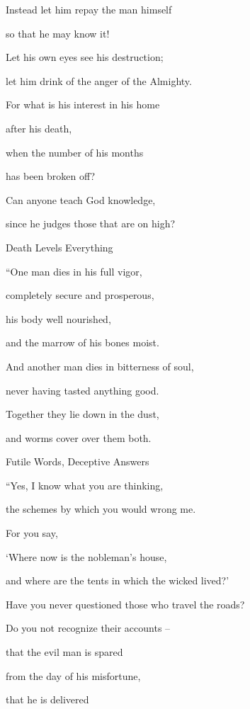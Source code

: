 {\par }{\Q Instead let him repay
the man himself

\par }{\Q so that he may know it!
\par }{\Q {}Let his own eyes
see
his destruction;
\par }{\Q let him drink
of the anger
of the Almighty.
\par }{\Q {}For
what
is his interest
in his
home
\par }{\Q after
his death,

\par }{\Q when
the number
of his
months
\par }{\Q has been broken off?
\par }{\Q {}Can anyone teach
God
knowledge,
\par }{\Q since he judges
those that are on high?
\par }{\SH Death Levels Everything
\par }{\Q {}“One
man dies
in his full
vigor,
\par }{\Q completely
secure
and prosperous,
\par }{\Q {}his body
well nourished,
\par }{\Q and the marrow
of his bones
moist.
\par }{\Q {}And another man
dies
in bitterness
of soul,
\par }{\Q never
having tasted
anything good.
\par }{\Q {}Together
they lie
down in the dust,
\par }{\Q and worms
cover
over them both.
\par }{\SH Futile Words, Deceptive Answers
\par }{\Q {}“Yes,
I know
what you are thinking,
\par }{\Q the schemes
by which you would wrong me.
\par }{\Q {}For
you say,
\par }{\Q ‘Where
now is the nobleman’s
house,
\par }{\Q and where
are the tents
in which
the wicked
lived?’
\par }{\Q {}Have you never questioned
those who travel
the roads?
\par }{\Q Do you not
recognize
their accounts –
\par }{\Q {}that
the evil
man is spared
\par }{\Q from the day
of his misfortune,
\par }{\Q that he is delivered

}
